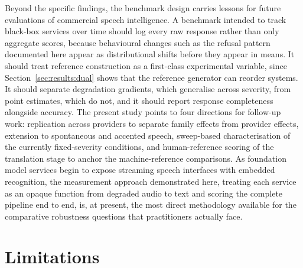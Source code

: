 Beyond the specific findings, the benchmark design carries lessons for
future evaluations of commercial speech intelligence. A benchmark intended
to track black-box services over time should log every raw response rather
than only aggregate scores, because behavioural changes such as the refusal
pattern documented here appear as distributional shifts before they appear
in means. It should treat reference construction as a first-class
experimental variable, since Section~\ref{sec:results:dual} shows that the
reference generator can reorder systems. It should separate degradation
gradients, which generalise across severity, from point estimates, which do
not, and it should report response completeness alongside accuracy. The
present study points to four directions for follow-up work: replication
across providers to separate family effects from provider effects, extension
to spontaneous and accented speech, sweep-based characterisation of the
currently fixed-severity conditions, and human-reference scoring of the
translation stage to anchor the machine-reference comparisons. As foundation
model services begin to expose streaming speech interfaces with embedded
recognition, the measurement approach demonstrated here, treating each
service as an opaque function from degraded audio to text and scoring the
complete pipeline end to end, is, at present, the most direct methodology available for
the comparative robustness questions that practitioners actually face.

\section{Limitations}
\label{sec:limitations}

